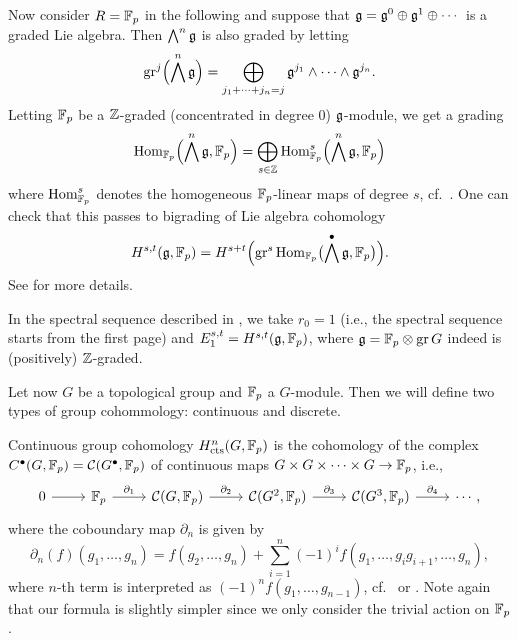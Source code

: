 Now consider $R=\mathbb{F}_{p}$ in the following and suppose that $\mathfrak{g} = \mathfrak{g}^0 \oplus \mathfrak{g}^1 \oplus \dotsb$ is a graded Lie algebra. Then $\bigwedge^n \mathfrak{g}$ is also graded by letting
\[
  \operatorname{gr}^j\Bigl( \bigwedge^n \mathfrak{g} \Bigr) = \bigoplus_{j_1+\dotsb+j_n = j} \mathfrak{g}^{j_1} \wedge \dotsb \wedge \mathfrak{g}^{j_n}.
\]
Letting $\mathbb{F}_{p}$ be a $\mathbb{Z}$-graded (concentrated in degree $0$) $\mathfrak{g}$-module, we get a grading
\[
  \operatorname{Hom}_{\mathbb{F}_{p}}\Bigl( \bigwedge^n \mathfrak{g}, \mathbb{F}_{p} \Bigr) = \bigoplus_{s \in \mathbb{Z}} \operatorname{Hom}_{\mathbb{F}_{p}}^s\Bigl( \bigwedge^n\mathfrak{g}, \mathbb{F}_{p} \Bigr)
\]
where $\operatorname{Hom}_{\mathbb{F}_{p}}^s$ denotes the homogeneous $\mathbb{F}_{p}$-linear maps of degree $s$, cf.\ \cite[Lem.~4.2]{Fossum}. One can check that this passes to bigrading of Lie algebra cohomology
\begin{equation*}
  H^{s,t}(\mathfrak{g}, \mathbb{F}_{p}) = H^{s+t}\Bigl( \operatorname{gr}^s \operatorname{Hom}_{\mathbb{F}_{p}}\bigl(\bigwedge^{\bullet} \mathfrak{g}, \mathbb{F}_{p} \bigr) \Bigr).
\end{equation*}%
%
See \cite[Chap.~1~§3]{Fuks} for more details.

In the spectral sequence described in \cite[§6.1]{Sor}, we take $r_{0} = 1$ (i.e., the spectral sequence starts from the first page) and $E_{1}^{s,t} = H^{s,t}(\mathfrak{g}, \mathbb{F}_{p})$, where $\mathfrak{g} = \mathbb{F}_{p} \otimes \operatorname{gr} G$ indeed is (positively) $\mathbb{Z}$-graded.

Let now $G$ be a topological group and $\mathbb{F}_{p}$ a $G$-module. Then we will define two types of group cohommology: continuous and discrete.

Continuous group cohomology $H_{\mathrm{cts}}^{n}(G,\mathbb{F}_{p})$ is the cohomology of the complex $C^{\bullet}(G,\mathbb{F}_{p}) = \mathcal{C}(G^{\bullet},\mathbb{F}_{p})$ of continuous maps $G \times G \times \dotsb \times G \to \mathbb{F}_{p}$, i.e.,
\[
  \begin{tikzcd}
    0 \ar[r] & \F_{p} \ar[r,"\partial_{1}"] & \Cont(G, \F_{p}) \ar[r,"\partial_{2}"] & \Cont(G^{2}, \F_{p}) \ar[r,"\partial_{3}"] &  \Cont(G^{3},\F_{p}) \ar[r,"\partial_{4}"] & \cdots,
  \end{tikzcd}
\]
where the coboundary map $\partial_{n}$ is given by
\begin{equation}\label{eq:group-coh-d}
  \partial_{n}(f)(g_{1},\dotsc,g_{n}) = f(g_{2},\dotsc,g_{n}) + \sum_{i=1}^{n}(-1)^{i}f(g_{1},\dotsc,g_{i}g_{i+1},\dotsc,g_{n}),
\end{equation}
where $n$-th term is interpreted as $(-1)^{n}f(g_{1},\dotsc,g_{n-1})$, cf.\ \cite[§3]{Sor} or \cite[§2]{GalCoh}. Note again that our formula is slightly simpler since we only consider the trivial action on $\mathbb{F}_{p}$.

